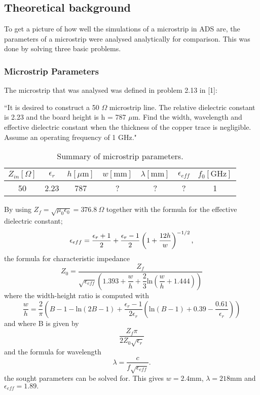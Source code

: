\documentclass[report.tex]{subfiles}
\begin{document}
\subsection{Theoretical background}\label{sec: Lab1 Theoretical Background}
To get a picture of how well the simulations of a microstrip in ADS are, the parameters of a microstrip  were analysed analytically for comparison. This was done by solving three basic problems.

\subsubsection{Microstrip Parameters}\label{subsubsec: Microstrip_Parameters}
The microstrip that was analysed was defined in problem 2.13 in [1]:

``It is desired to construct a 50 $\Omega$ microstrip line. The relative dielectric constant is 2.23 and the board height is h = 787 $\mu \text{m.}$ Find the width, wavelength and effective dielectric constant when the thickness of the copper trace is negligible. Assume an operating frequency of 1 GHz."

\begin{table}[h]
    \centering
    \caption{Summary of microstrip parameters.}
    \begin{tabular}{c | c | c | c | c | c | c}
        $Z_{in} [\Omega]$ & $\epsilon_r $ & $h [\mu \text{m}]$ & $w [\text{mm}]$ & $\lambda [\text{mm}]$ & $\epsilon_{eff}$ & $f_0 [\text{GHz}]$\\
        \hline
         50 & 2.23 & 787 & ? & ? & ? & 1
    \end{tabular}
    \label{table: Lab1 Microstrip parameters}
\end{table}

By using $Z_{f} = \sqrt{\mu_{0} \epsilon_{0}} = 376.8\:\Omega$ together with the formula for the effective dielectric constant;
\begin{equation}
	\epsilon_{eff} = \dfrac{\epsilon_{r} + 1}{2} + \dfrac{\epsilon_{r} - 1}{2} \left(1 + {\dfrac{12 h}{w}} \right)^{-1/2} \text ,
\end{equation}
the formula for characteristic impedance
\begin{equation}
	Z_0 = \dfrac{Z_f}{\sqrt{\epsilon_{eff}}\left(1.393 + \dfrac{w}{h} + \dfrac{2}{3} \text{ln}\left(\dfrac{w}{h} + 1.444 \right)\right)}
\end{equation}
where the width-height ratio is computed with
\begin{equation}
	\dfrac{w}{h} = \dfrac{2}{\pi}\left(B - 1 - \text{ln}\left(2B - 1 \right) + \dfrac{\epsilon_r - 1}{2 \epsilon_r}\left(\text{ln}\left(B -1\right) + 0.39 - \dfrac{0.61}{\epsilon_r}\right)\right)
\end{equation}
and where B is given by
\begin{equation}
\dfrac{Z_f \pi}{2Z_0\sqrt{\epsilon_r}}
\end{equation}
and the formula for wavelength
\begin{equation}
	\lambda = \dfrac{c}{f\sqrt{\epsilon_{eff}}}.
\end{equation}
the sought parameters can be solved for. This gives $w = 2.4 \text{mm}$, $\lambda = 218 \text{mm}$ and $\epsilon_{eff} = 1.89 \text{.}$
\end{document}
